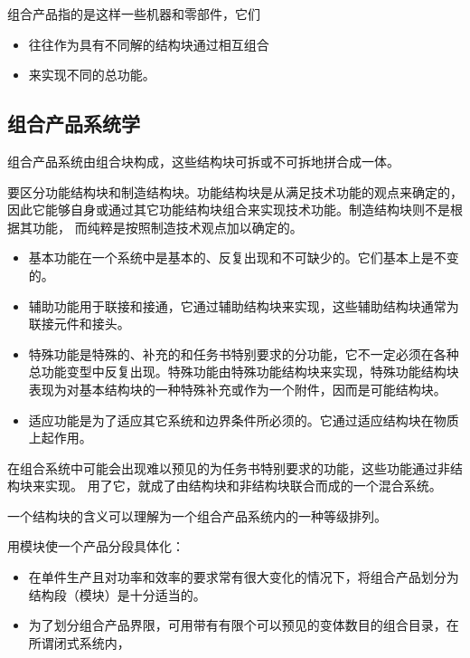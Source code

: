 \documentclass[letterpaper,10pt,english]{sphinxmanual}
\begin{document}
组合产品指的是这样一些机器和零部件，它们
\begin{itemize}
\item {} 
往往作为具有不同解的结构块通过相互组合

\item {} 
来实现不同的总功能。

\end{itemize}


\subsection{组合产品系统学}
\label{unit7:id10}
组合产品系统由组合块构成，这些结构块可拆或不可拆地拼合成一体。

要区分功能结构块和制造结构块。功能结构块是从满足技术功能的观点来确定的，
因此它能够自身或通过其它功能结构块组合来实现技术功能。制造结构块则不是根据其功能，
而纯粹是按照制造技术观点加以确定的。
\begin{itemize}
\item {} 
基本功能在一个系统中是基本的、反复出现和不可缺少的。它们基本上是不变的。

\item {} 
辅助功能用于联接和接通，它通过辅助结构块来实现，这些辅助结构块通常为联接元件和接头。

\item {} 
特殊功能是特殊的、补充的和任务书特别要求的分功能，它不一定必须在各种总功能变型中反复出现。特殊功能由特殊功能结构块来实现，特殊功能结构块表现为对基本结构块的一种特殊补充或作为一个附件，因而是可能结构块。

\item {} 
适应功能是为了适应其它系统和边界条件所必须的。它通过适应结构块在物质上起作用。

\end{itemize}

在组合系统中可能会出现难以预见的为任务书特别要求的功能，这些功能通过非结构块来实现。
用了它，就成了由结构块和非结构块联合而成的一个混合系统。

一个结构块的含义可以理解为一个组合产品系统内的一种等级排列。

用模块使一个产品分段具体化：
\begin{itemize}
\item {} 
在单件生产且对功率和效率的要求常有很大变化的情况下，将组合产品划分为结构段（模块）是十分适当的。

\item {} 
为了划分组合产品界限，可用带有有限个可以预见的变体数目的组合目录，在所谓闭式系统内，

\end{itemize}
\end{document}
